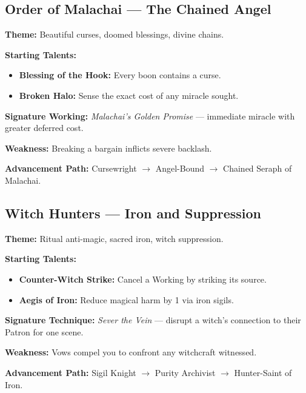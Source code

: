 \documentclass[11pt]{book}
\begin{document}
\subsection*{Order of Malachai --- The Chained Angel}
\begin{tcolorbox}[colback=mistgray!10, colframe=bloodrust, title={The Chain-Bearer}]
\textbf{Theme:} Beautiful curses, doomed blessings, divine chains.

\textbf{Starting Talents:}
\begin{itemize}[noitemsep]
    \item \textbf{Blessing of the Hook:} Every boon contains a curse.
    \item \textbf{Broken Halo:} Sense the exact cost of any miracle sought.
\end{itemize}

\textbf{Signature Working:} \emph{Malachai's Golden Promise} --- immediate
miracle with greater deferred cost.

\textbf{Weakness:} Breaking a bargain inflicts severe backlash.

\textbf{Advancement Path:} Cursewright $\rightarrow$ Angel-Bound 
$\rightarrow$ Chained Seraph of Malachai.
\end{tcolorbox}

\subsection*{Witch Hunters --- Iron and Suppression}
\begin{tcolorbox}[colback=mistgray!10, colframe=shadowviolet, title={The Iron Acolyte}]
\textbf{Theme:} Ritual anti-magic, sacred iron, witch suppression.

\textbf{Starting Talents:}
\begin{itemize}[noitemsep]
    \item \textbf{Counter-Witch Strike:} Cancel a Working by striking its source.
    \item \textbf{Aegis of Iron:} Reduce magical harm by 1 via iron sigils.
\end{itemize}

\textbf{Signature Technique:} \emph{Sever the Vein} --- disrupt a witch's 
connection to their Patron for one scene.

\textbf{Weakness:} Vows compel you to confront any witchcraft witnessed.

\textbf{Advancement Path:} Sigil Knight $\rightarrow$ Purity Archivist 
$\rightarrow$ Hunter-Saint of Iron.
\end{tcolorbox}
\end{document}
